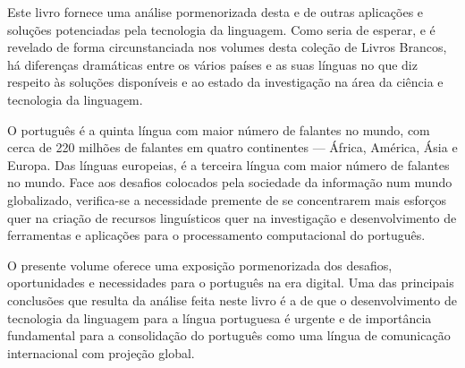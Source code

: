 \begin{multicols}{2}
Este livro fornece uma análise pormenorizada desta e de outras aplicações
e soluções potenciadas pela tecnologia da linguagem. Como seria de esperar, e é revelado de forma circunstanciada nos volumes desta coleção de Livros Brancos, 
há di\-fe\-ren\-ças dramáticas entre os vários países e as suas línguas no que diz respeito 
às soluções disponíveis e ao estado da investigação na área da ciência e tecnologia 
da linguagem. 

O português é a quinta língua com maior número de falantes no mundo, 
com cerca de 220 milhões de falantes em quatro continentes --- África, América, Ásia e Europa. 
Das línguas europeias, é a terceira língua com maior número de falantes
no mundo. Face aos desafios colocados pela sociedade da informação num mundo globalizado, verifica-se a necessidade premente de se concentrarem mais esforços quer 
na criação de recursos linguísticos quer na investigação e desenvolvimento de ferramentas e aplicações para o processamento computacional do português.


O presente volume oferece uma exposição pormenorizada dos desafios, oportunidades 
e necessidades para o português na era digital.
Uma das principais conclusões que resulta da análise feita neste livro é a de que o desenvolvimento 
de tecnologia da linguagem para a língua portuguesa é urgente e de importância fundamental para a consolidação do português como uma língua de comunicação internacional com projeção global.

\end{multicols}

\clearpage



